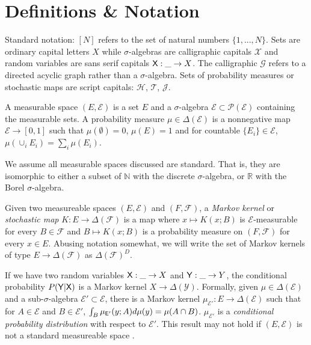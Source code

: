 \section{Definitions \& Notation}\label{sec:dfin}

Standard notation: $[N]$ refers to the set of natural numbers $\{1,...,N\}$. Sets are ordinary capital letters $X$ while $\sigma$-algebras are calligraphic capitals $\mathcal{X}$ and random variables are sans serif capitals $\mathsf{X}:\_\to X$. The calligraphic $\mathcal{G}$ refers to a directed acyclic graph rather than a $\sigma$-algebra. Sets of probability measures or stochastic maps are script capitals: $\mathscr{H}$, $\mathscr{T}$, $\mathscr{J}$.

A measurable space $(E,\mathcal{E})$ is a set $E$ and a $\sigma$-algebra $\mathcal{E}\subset\mathcal{P}(\mathcal{E})$ containing the measurable sets. A probability measure $\mu\in \Delta(\mathcal{E})$ is a nonnegative map $\mathcal{E}\to[0,1]$ such that $\mu(\emptyset)=0$, $\mu(E)=1$ and for countable $\{E_i\}\in \mathcal{E}$, $\mu(\cup_i E_i) = \sum_i \mu(E_i)$.

We assume all measurable spaces discussed are standard. That is, they are isomorphic to either a subset of $\mathbb{N}$ with the discrete $\sigma$-algebra, or $\mathbb{R}$ with the Borel $\sigma$-algebra.

Given two measureable spaces $(E,\mathcal{E})$ and $(F,\mathcal{F})$, a \emph{Markov kernel} or \emph{stochastic map} $K:E\to \Delta(\mathcal{F})$ is a map where $x\mapsto K(x;B)$ is $\mathcal{E}$-measurable for every $B\in\mathcal{F}$ and $B\mapsto K(x;B)$ is a probability measure on $(F,\mathcal{F})$ for every $x\in E$. Abusing notation somewhat, we will write the set of Markov kernels of type $E\to \Delta(\mathcal{F})$ as $\Delta(\mathcal{F})^D$. 

If we have two random variables $\mathsf{X}:\_\to X$ and $\mathsf{Y}:\_\to Y$, the conditional probability $P(\mathsf{Y}|\mathsf{X})$ is a Markov kernel $X\to \Delta(\mathcal{Y})$. Formally, given $\mu\in \Delta(\mathcal{E})$ and a sub-$\sigma$-algebra $\mathcal{E}'\subset\mathcal{E}$, there is a Markov kernel $\mu_{\mathcal{E}'}:E\to\Delta(\mathcal{E})$ such that for $A\in\mathcal{E}$ and $B\in \mathcal{E}'$, $\int_B \mu_{\mathsf{E}'}(y;A) d\mu(y) = \mu(A\cap B)$. $\mu_{\mathcal{E}'}$ is a \emph{conditional probability distribution} with respect to $\mathcal{E}'$. This result may not hold if $(E,\mathcal{E})$ is not a standard measureable space \citep{cinlar_probability_2011}.

